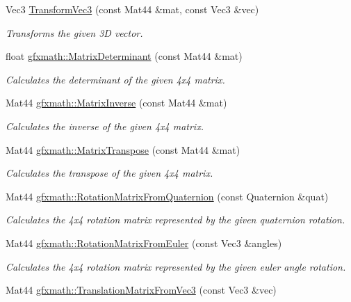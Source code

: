 \begin{DoxyCompactItemize}
Vec3 \hyperlink{group___s_i_s_d_mat_math_ga503b30792d41234b29089176be81cf6c}{Transform\+Vec3} (const Mat44 \&mat, const Vec3 \&vec)
\begin{DoxyCompactList}\small\item\em Transforms the given 3\+D vector. \end{DoxyCompactList}\item 
float \hyperlink{group___s_i_s_d_mat_math_ga285829d964b38ad14730e85c325e775c}{gfxmath\+::\+Matrix\+Determinant} (const Mat44 \&mat)
\begin{DoxyCompactList}\small\item\em Calculates the determinant of the given 4x4 matrix. \end{DoxyCompactList}\item 
Mat44 \hyperlink{group___s_i_s_d_mat_math_ga38c661c8ad19528520d36fabca7d555f}{gfxmath\+::\+Matrix\+Inverse} (const Mat44 \&mat)
\begin{DoxyCompactList}\small\item\em Calculates the inverse of the given 4x4 matrix. \end{DoxyCompactList}\item 
Mat44 \hyperlink{group___s_i_s_d_mat_math_ga626e52b58fb763a90ba6e9d46966ee75}{gfxmath\+::\+Matrix\+Transpose} (const Mat44 \&mat)
\begin{DoxyCompactList}\small\item\em Calculates the transpose of the given 4x4 matrix. \end{DoxyCompactList}\item 
Mat44 \hyperlink{group___s_i_s_d_mat_math_gad7198c521a4d93e82694f39f0be736c9}{gfxmath\+::\+Rotation\+Matrix\+From\+Quaternion} (const Quaternion \&quat)
\begin{DoxyCompactList}\small\item\em Calculates the 4x4 rotation matrix represented by the given quaternion rotation. \end{DoxyCompactList}\item 
Mat44 \hyperlink{group___s_i_s_d_mat_math_ga206e53fa5ea77b54765946af3d04ca0e}{gfxmath\+::\+Rotation\+Matrix\+From\+Euler} (const Vec3 \&angles)
\begin{DoxyCompactList}\small\item\em Calculates the 4x4 rotation matrix represented by the given euler angle rotation. \end{DoxyCompactList}\item 
Mat44 \hyperlink{group___s_i_s_d_mat_math_ga2d82d58bdc14d1f1644b05a7419ea05e}{gfxmath\+::\+Translation\+Matrix\+From\+Vec3} (const Vec3 \&vec)

\end{DoxyCompactItemize}
